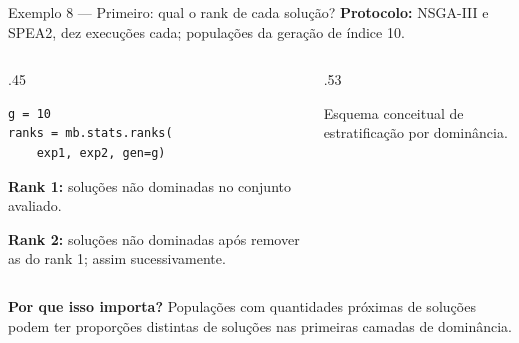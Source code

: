 \begin{frame}[fragile]{Exemplo 8 — Primeiro: qual o rank de cada solução?}
\textbf{Protocolo:} NSGA-III e SPEA2, dez execuções cada; populações da geração de índice 10.
\begin{columns}[T,onlytextwidth]
\begin{column}{.45\textwidth}
\begin{lstlisting}[style=python,basicstyle=\ttfamily\fontsize{8}{10}\selectfont]
g = 10
ranks = mb.stats.ranks(
    exp1, exp2, gen=g)
\end{lstlisting}
\textbf{Rank 1:} soluções não dominadas no conjunto avaliado.
\par\smallskip
\textbf{Rank 2:} soluções não dominadas após remover as do rank 1; assim sucessivamente.
\end{column}
\begin{column}{.53\textwidth}
\centering
{}
\par{\scriptsize Esquema conceitual de estratificação por dominância.}
\end{column}
\end{columns}
\vspace{.07cm}\textbf{Por que isso importa?} Populações com quantidades próximas de soluções podem ter proporções distintas de soluções nas primeiras camadas de dominância.
\end{frame}


